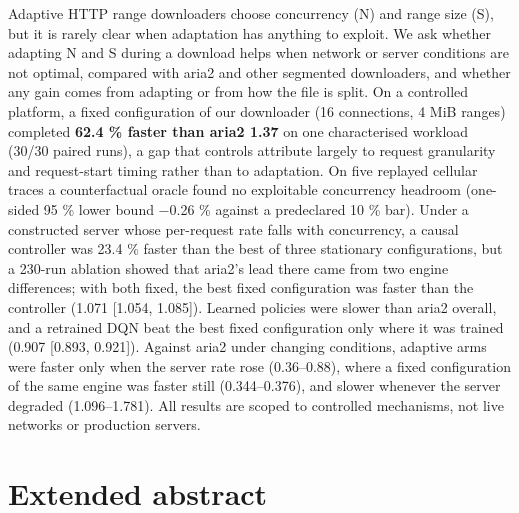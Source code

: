 \documentclass[10pt,a4paper]{article}
\begin{document}
Adaptive HTTP range downloaders choose concurrency (N) and range size (S), but it is rarely clear when adaptation has anything to exploit. We ask whether adapting N and S during a download helps when network or server conditions are not optimal, compared with aria2 and other segmented downloaders, and whether any gain comes from adapting or from how the file is split. On a controlled platform, a fixed configuration of our downloader (16 connections, 4 MiB ranges) completed \textbf{62.4 \% faster than aria2 1.37} on one characterised workload (30/30 paired runs), a gap that controls attribute largely to request granularity and request-start timing rather than to adaptation. On five replayed cellular traces a counterfactual oracle found no exploitable concurrency headroom (one-sided 95 \% lower bound −0.26 \% against a predeclared 10 \% bar). Under a constructed server whose per-request rate falls with concurrency, a causal controller was 23.4 \% faster than the best of three stationary configurations, but a 230-run ablation showed that aria2's lead there came from two engine differences; with both fixed, the best fixed configuration was faster than the controller (1.071 [1.054, 1.085]). Learned policies were slower than aria2 overall, and a retrained DQN beat the best fixed configuration only where it was trained (0.907 [0.893, 0.921]). Against aria2 under changing conditions, adaptive arms were faster only when the server rate rose (0.36–0.88), where a fixed configuration of the same engine was faster still (0.344–0.376), and slower whenever the server degraded (1.096–1.781). All results are scoped to controlled mechanisms, not live networks or production servers.


\section*{Extended abstract}
\end{document}
